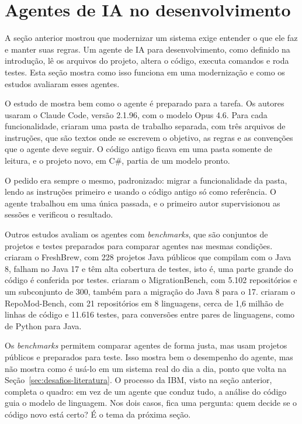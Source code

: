 \section{Agentes de IA no desenvolvimento}

A seção anterior mostrou que modernizar um sistema exige entender o que ele faz e manter suas regras. Um agente de IA para desenvolvimento, como definido na introdução, lê os arquivos do projeto, altera o código, executa comandos e roda testes. Esta seção mostra como isso funciona em uma modernização e como os estudos avaliaram esses agentes.

O estudo de  mostra bem como o agente é preparado para a tarefa. Os autores usaram o Claude Code, versão 2.1.96, com o modelo Opus 4.6. Para cada funcionalidade, criaram uma pasta de trabalho separada, com três arquivos de instruções, que são textos onde se escrevem o objetivo, as regras e as convenções que o agente deve seguir. O código antigo ficava em uma pasta somente de leitura, e o projeto novo, em C\#, partia de um modelo pronto.

O pedido era sempre o mesmo, padronizado: migrar a funcionalidade da pasta, lendo as instruções primeiro e usando o código antigo só como referência. O agente trabalhou em uma única passada, e o primeiro autor supervisionou as sessões e verificou o resultado.

Outros estudos avaliam os agentes com \textit{benchmarks}, que são conjuntos de projetos e testes preparados para comparar agentes nas mesmas condições.  criaram o FreshBrew, com 228 projetos Java públicos que compilam com o Java 8, falham no Java 17 e têm alta cobertura de testes, isto é, uma parte grande do código é conferida por testes.  criaram o MigrationBench, com 5.102 repositórios e um subconjunto de 300, também para a migração do Java 8 para o 17.  criaram o RepoMod-Bench, com 21 repositórios em 8 linguagens, cerca de 1,6 milhão de linhas de código e 11.616 testes, para conversões entre pares de linguagens, como de Python para Java.

Os \textit{benchmarks} permitem comparar agentes de forma justa, mas usam projetos públicos e preparados para teste. Isso mostra bem o desempenho do agente, mas não mostra como é usá-lo em um sistema real do dia a dia, ponto que volta na Seção~\ref{sec:desafios-literatura}. O processo da IBM, visto na seção anterior, completa o quadro: em vez de um agente que conduz tudo, a análise do código guia o modelo de linguagem. Nos dois casos, fica uma pergunta: quem decide se o código novo está certo? É o tema da próxima seção.

